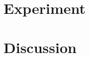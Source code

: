 \part{Experiment}


\part{Discussion}


\cleardoublepage %






\cleardoublepage %

\cleardoublepage %

\cleardoublepage %




